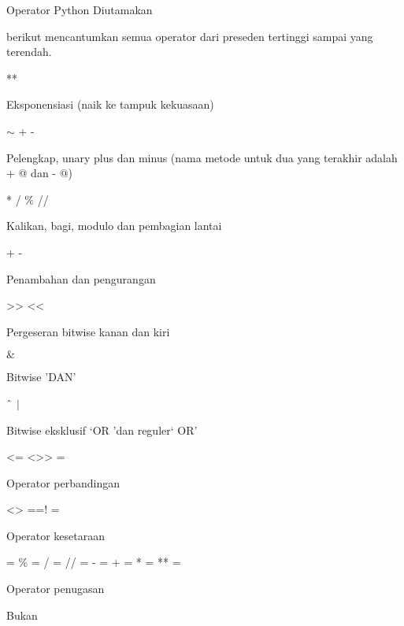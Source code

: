 \vspace{12pt}
\noindent 
Operator Python Diutamakan \par
\vspace{12pt}
\noindent 
 berikut mencantumkan semua operator dari preseden tertinggi sampai yang terendah. \par
\vspace{12pt}
\noindent 
** \par
\noindent 
Eksponensiasi (naik ke tampuk kekuasaan) \par
\vspace{12pt}
\noindent 
 $  \sim  $ + - \par
\noindent 
Pelengkap, unary plus dan minus (nama metode untuk dua yang terakhir adalah + @ dan - @) \par
\vspace{12pt}
\noindent 
* / $  \%  $ // \par
\noindent 
Kalikan, bagi, modulo dan pembagian lantai \par
\vspace{12pt}
\noindent 
+ - \par
\noindent 
Penambahan dan pengurangan \par
\vspace{12pt}
\noindent 
>> << \par
\noindent 
Pergeseran bitwise kanan dan kiri \par
\vspace{12pt}
\noindent 
 $  \&  $ \par
\noindent 
Bitwise 'DAN' \par
\vspace{12pt}
\noindent 
 $  \string^  $  $  \vert  $ \par
\noindent 
Bitwise eksklusif `OR 'dan reguler` OR' \par
\vspace{12pt}
\noindent 
<= <>> = \par
\noindent 
Operator perbandingan \par
\vspace{12pt}
\noindent 
<> ==! = \par
\noindent 
Operator kesetaraan \par
\vspace{12pt}
\noindent 
= $  \%  $ = / = // = - = + = * = ** = \par
\noindent 
Operator penugasan \par
\vspace{12pt}
\noindent 
Bukan \par
\noindent 
